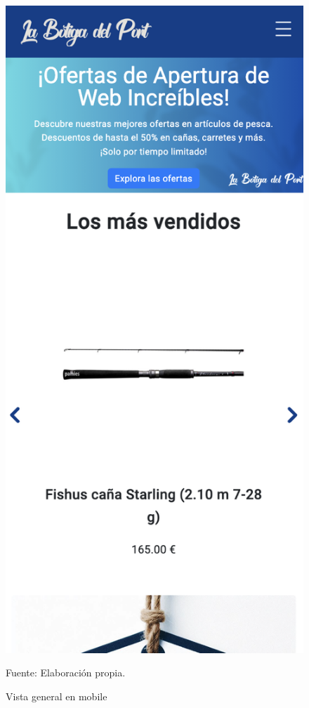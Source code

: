 \begin{figure}[H]
\begin{center}
\includegraphics[scale=0.35]{./Images/vistaMobile.png}
\caption{Vista general en mobile} Fuente: Elaboración propia.

\label{fig:fig2}

\end{center}
\end{figure}

